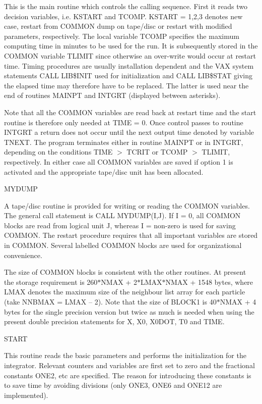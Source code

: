   This is the main routine which controls the calling sequence.  First it reads
  two decision variables, i.e. KSTART and TCOMP.  KSTART = 1,2,3 denotes new
 case,
 restart from COMMON dump on tape/disc or restart with modified parameters,
 respectively.  The local variable TCOMP specifies the maximum computing time
 in minutes to be used for the run.  It is subsequently stored in the COMMON
 variable TLIMIT since otherwise an over-write would occur at
 restart time.  Timing
 procedures are usually installation dependent and the VAX system statements
 CALL LIB\$INIT used for initialization and CALL LIB\$STAT giving the elapsed
 time may therefore have to be replaced.  The latter is used near the end
 of routines MAINPT and INTGRT (displayed between asterisks).

 Note that all the COMMON variables are read back at restart time and the start
 routine is therefore only needed at TIME = 0.  Once control passes to routine
 INTGRT a return does not occur until the next output time denoted by variable
 TNEXT.  The program terminates either in routine MAINPT or in INTGRT, depending
 on the conditions TIME $>$ TCRIT or TCOMP $>$ TLIMIT, respectively.  In either
 case
 all COMMON variables are saved if option 1 is activated and the appropriate
 tape/disc unit has been allocated.
\bigskip
\bigskip
\centerline {MYDUMP}
\bigskip
 A tape/disc routine is provided for writing or reading the COMMON
 variables.  The general
             call statement is CALL MYDUMP(I,J).  If I = 0, all COMMON blocks
 are read from logical unit J, whereas I = non-zero is used for saving
 COMMON.  The restart
 procedure requires that all important variables are stored in COMMON.  Several
 labelled COMMON blocks are used for organizational convenience.

 The size of COMMON blocks is consistent with the other routines.  At
 present the storage requirement is 260$\ast$NMAX + 2$\ast$LMAX$\ast$NMAX + 1548
 bytes,
 where LMAX denotes the maximum size of the neighbour list array for each
 particle (take NNBMAX = LMAX -- 2).  Note that the size of BLOCK1 is
 40$\ast$NMAX + 4
 bytes for the single precision version but twice as much is needed when
 using the present double precision statements for
 X, X0, X0DOT, T0 and TIME.
\bigskip
\bigskip
\centerline {START}
\bigskip
 This routine reads the basic parameters and performs the initialization for
 the integrator.  Relevant counters and variables are first set to zero and the
 fractional constants ONE2, etc are specified.  The reason for introducing these
 constants is to save time by avoiding divisions (only ONE3, ONE6 and
 ONE12 are implemented).

